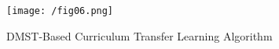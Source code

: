 \documentclass[12pt]{article}
\begin{document}
\begin{figure}[h]
  \centering
  \texttt{[image: /fig06.png]}
  \caption{DMST-Based Curriculum Transfer Learning Algorithm}
\end{figure}




\newpage



\end{document}
